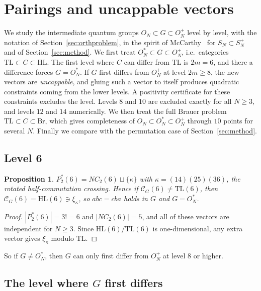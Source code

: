 \documentclass[11pt]{amsart}
\newtheorem{proposition}[theorem]{Proposition}
\theoremstyle{definition}
\theoremstyle{remark}
\theoremstyle{plain}
\numberwithin{equation}{section}
\numberwithin{table}{section}
\newcommand{\TL}{\mathrm{TL}}
\newcommand{\HL}{\mathrm{HL}}
\newcommand{\Br}{\mathrm{Br}}
\begin{document}

\section{Pairings and uncappable vectors}\label{sec:pairings}

We study the intermediate quantum groups $O_N\subset G\subset O_N^+$ level by level, with the notation of
Section~\ref{sec:orthproblem}, in the spirit of McCarthy~\cite{mc2} for $S_N\subset S_N^+$ and of Section~\ref{sec:method}. We first treat
$O_N^*\subset G\subset O_N^+$, i.e.\ categories $\TL\subset C\subset\HL$. The first level where $C$ can differ from $\TL$ is
$2m=6$, and there a difference forces $G=O_N^*$. If $G$ first differs from $O_N^+$ at level $2m\ge8$, the new vectors are
\emph{uncappable}, and gluing such a vector to itself produces quadratic constraints coming from the lower levels. A
positivity certificate for these constraints excludes the level. Levels $8$ and $10$ are excluded exactly for all
$N\ge3$, and levels $12$ and $14$ numerically. We then treat the full Brauer problem $\TL\subset C\subset\Br$, which gives
completeness of $O_N\subset O_N^*\subset O_N^+$ through $10$ points for several $N$. Finally we compare with the
permutation case of Section~\ref{sec:method}.

\subsection{Level 6}

\begin{proposition}\label{prop:6}
$P_2^*(6)=NC_2(6)\sqcup\{\kappa\}$ with $\kappa=(14)(25)(36)$, the rotated half-commutation crossing.
Hence if $\mathcal C_G(6)\neq\TL(6)$, then $\mathcal C_G(6)=\HL(6)\ni\xi_\kappa$, so $abc=cba$ holds in $G$ and $G=O_N^*$.
\end{proposition}
\begin{proof}
$|P_2^*(6)|=3!=6$ and $|NC_2(6)|=5$, and all of these vectors are independent for $N\ge3$. Since
$\HL(6)/\TL(6)$ is one-dimensional, any extra vector gives $\xi_\kappa$ modulo $\TL$.
\end{proof}
So if $G\ne O_N^*$, then $G$ can only first differ from $O_N^+$ at level $8$ or higher.

\subsection{The level where $G$ first differs}
\end{document}
